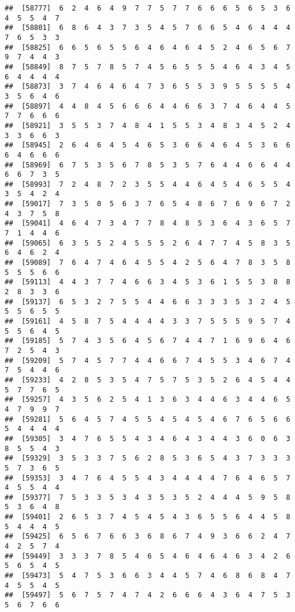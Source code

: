 \documentclass[
]{book}
\begin{document}
\begin{verbatim}
##  [58777]  6  2  4  6  4  9  7  7  5  7  7  6  6  6  5  6  5  3  6  4  5  5  4  7
##  [58801]  6  8  6  4  3  7  3  5  4  5  7  6  6  5  4  6  4  4  4  7  6  5  3  3
##  [58825]  6  6  5  6  5  5  6  4  6  4  6  4  5  2  4  6  5  6  7  9  7  4  4  3
##  [58849]  8  7  5  7  8  5  7  4  5  6  5  5  5  4  6  4  3  4  5  6  4  4  4  4
##  [58873]  3  7  4  6  4  6  4  7  3  6  5  5  3  9  5  5  5  5  4  3  5  6  4  6
##  [58897]  4  4  8  4  5  6  6  6  4  4  6  6  3  7  4  6  4  4  5  7  7  6  6  6
##  [58921]  3  5  5  3  7  4  8  4  1  5  5  3  4  8  3  4  5  2  4  3  3  6  6  3
##  [58945]  2  6  4  6  4  5  4  6  5  3  6  6  4  6  4  5  3  6  6  6  4  6  6  6
##  [58969]  6  7  5  3  5  6  7  8  5  3  5  7  6  4  4  6  6  4  4  6  6  7  3  5
##  [58993]  7  2  4  8  7  2  3  5  5  4  4  6  4  5  4  6  5  5  4  3  5  4  2  4
##  [59017]  7  3  5  0  5  6  3  7  6  5  4  8  6  7  6  9  6  7  2  4  3  7  5  8
##  [59041]  4  6  4  7  3  4  7  7  8  4  8  5  3  6  4  3  6  5  7  7  1  4  4  6
##  [59065]  6  3  5  5  2  4  5  5  5  2  6  4  7  7  4  5  8  3  5  6  4  6  2  4
##  [59089]  7  6  4  7  4  6  4  5  5  4  2  5  6  4  7  8  3  5  8  5  5  5  6  6
##  [59113]  4  4  3  7  7  4  6  6  3  4  5  3  6  1  5  5  3  8  8  2  8  3  3  6
##  [59137]  6  5  3  2  7  5  5  4  4  6  6  3  3  3  5  3  2  4  5  5  5  6  5  5
##  [59161]  4  5  8  7  5  4  4  4  4  3  3  7  5  5  5  9  5  7  4  5  5  6  4  5
##  [59185]  5  7  4  3  5  6  4  5  6  7  4  4  7  1  6  9  6  4  6  7  2  5  4  3
##  [59209]  5  7  4  5  7  7  4  4  6  6  7  4  5  5  3  4  6  7  4  7  5  4  4  6
##  [59233]  4  2  8  5  3  5  4  7  5  7  5  3  5  2  6  4  5  4  4  5  7  7  6  5
##  [59257]  4  3  5  6  2  5  4  1  3  6  3  4  4  6  3  4  4  6  5  4  7  9  9  7
##  [59281]  5  6  4  5  7  4  5  5  4  5  4  5  4  6  7  6  5  6  6  5  4  4  4  4
##  [59305]  3  4  7  6  5  5  4  3  4  6  4  3  4  4  3  6  0  6  3  8  5  5  4  3
##  [59329]  3  5  3  3  7  5  6  2  8  5  3  6  5  4  3  7  3  3  3  5  7  3  6  5
##  [59353]  3  4  7  6  4  5  5  4  3  4  4  4  4  7  6  4  6  5  7  4  5  5  4  4
##  [59377]  7  5  3  3  5  3  4  3  5  3  5  2  4  4  4  5  9  5  8  5  3  6  4  8
##  [59401]  2  6  5  3  7  4  5  4  5  4  3  6  5  5  6  4  4  5  8  5  4  4  4  5
##  [59425]  6  5  6  7  6  6  3  6  8  6  7  4  9  3  6  6  2  4  7  4  2  5  7  4
##  [59449]  3  3  3  7  8  5  4  6  5  4  6  4  6  4  6  3  4  2  6  5  6  5  4  5
##  [59473]  5  4  7  5  3  6  6  3  4  4  5  7  4  6  8  6  8  4  7  4  5  5  4  5
##  [59497]  5  6  7  5  7  4  7  4  2  6  6  6  4  3  6  4  7  5  3  5  6  7  6  6

\end{verbatim}
\end{document}
